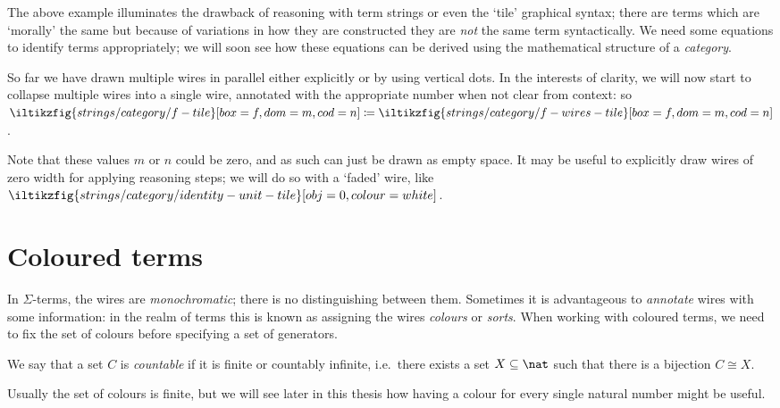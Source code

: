The above example illuminates the drawback of reasoning with term strings or
even the `tile' graphical syntax; there are terms which are `morally' the same
but because of variations in how they are constructed they are \emph{not} the
same term syntactically.
We need some equations to identify terms appropriately; we will soon see how
these equations can be derived using the mathematical structure of a
\emph{category}.

\begin{notation}\label{not:arbitrary-width-wires}
    So far we have drawn multiple wires in parallel either explicitly or
    by using vertical dots.
    In the interests of clarity, we will now start to collapse multiple wires
    into a single wire, annotated with the appropriate number when not clear
    from context: so \(
    \iltikzfig{strings/category/f-tile}[box=f,dom=m,cod=n]
    \coloneqq
    \iltikzfig{strings/category/f-wires-tile}[box=f,dom=m,cod=n]
    \).

    Note that these values \(m\) or \(n\) could be zero, and as such can just be
    drawn as empty space.
    It may be useful to explicitly draw wires of zero width for applying
    reasoning steps; we will do so with a `faded' wire, like \(
    \iltikzfig{strings/category/identity-unit-tile}[obj=0,colour=white]
    \).
\end{notation}

\section{Coloured terms}

In \(\Sigma\)-terms, the wires are \emph{monochromatic}; there is no
distinguishing between them.
Sometimes it is advantageous to \emph{annotate} wires with some information: in
the realm of terms this is known as assigning the wires \emph{colours} or
\emph{sorts}.
When working with coloured terms, we need to fix the set of colours before
specifying a set of generators.

\begin{notation}
    We say that a set \(C\) is \emph{countable} if it is finite or countably
    infinite, i.e.\ there exists a set \(X \subseteq \nat\) such that there is a
    bijection \(C \cong X\).
\end{notation}

\begin{remark}
    Usually the set of colours is finite, but we will see later in this thesis
    how having a colour for every single natural number might be useful.
\end{remark}

